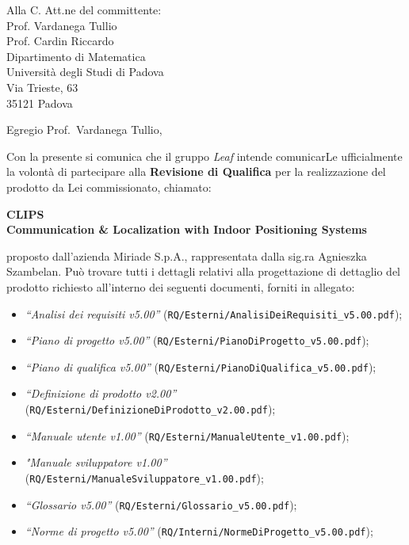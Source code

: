 \documentclass[a4paper,12pt]{letteracdp}
\author{Davide Castello}
\date{16 maggio 2016}
\begin{document}
	\begin{letter}{
		Alla C. Att.ne del committente: \\
		Prof. Vardanega Tullio \\
		Prof. Cardin Riccardo \\
		Dipartimento di Matematica \\
		Università degli Studi di Padova \\
		Via Trieste, 63 \\
		35121 Padova}
		
		\opening{Egregio Prof.~Vardanega Tullio,}
		Con la presente si comunica che il gruppo \textit{Leaf} intende comunicarLe ufficialmente la volontà di partecipare alla \textbf{Revisione di Qualifica} per la realizzazione del prodotto da Lei commissionato, chiamato:
\begin{center}
	\textbf{CLIPS \\ Communication \& Localization with Indoor Positioning Systems}
\end{center}
proposto dall'azienda Miriade S.p.A., rappresentata dalla sig.ra Agnieszka Szambelan.
Può trovare tutti i dettagli relativi alla progettazione di dettaglio del prodotto richiesto all'interno dei seguenti documenti, forniti in allegato:
%
\begin{itemize}
	\item \textit{“Analisi dei requisiti v5.00”} (\texttt{RQ/Esterni/AnalisiDeiRequisiti\_v5.00.pdf});

	\item \textit{“Piano di progetto v5.00”} (\texttt{RQ/Esterni/PianoDiProgetto\_v5.00.pdf});

	\item \textit{“Piano di qualifica v5.00”} (\texttt{RQ/Esterni/PianoDiQualifica\_v5.00.pdf});
	
	\item \textit{“Definizione di prodotto v2.00”} (\texttt{RQ/Esterni/DefinizioneDiProdotto\_v2.00.pdf});
	
	\item \textit{“Manuale utente v1.00”} (\texttt{RQ/Esterni/ManualeUtente\_v1.00.pdf});
	
	\item \textit{"Manuale sviluppatore v1.00”} (\texttt{RQ/Esterni/ManualeSviluppatore\_v1.00.pdf});
	
	\item \textit{“Glossario v5.00”} (\texttt{RQ/Esterni/Glossario\_v5.00.pdf});
	
	\item \textit{“Norme di progetto v5.00”} (\texttt{RQ/Interni/NormeDiProgetto\_v5.00.pdf});


\end{itemize}
\end{letter}
\end{document}
